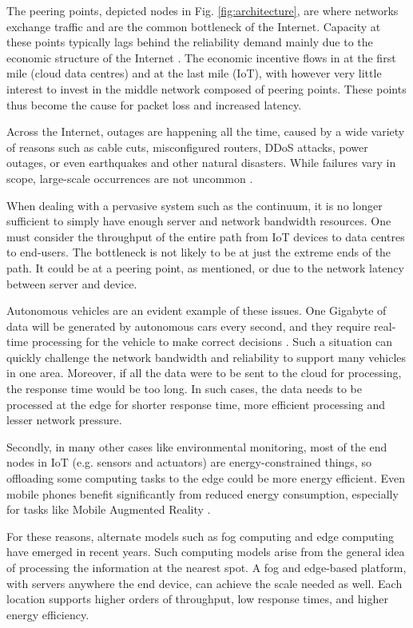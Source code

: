 The peering points, depicted nodes in Fig. \ref{fig:architecture}, are where networks exchange traffic and are the common bottleneck of the Internet. Capacity at these points typically lags behind the reliability demand mainly due to the economic structure of the Internet \cite{nygren2010akamai}. The economic incentive flows in at the first mile (cloud data centres) and at the last mile (IoT), with however very little interest to invest in the middle network composed of peering points. These points thus become the cause for packet loss and increased latency.

Across the Internet, outages are happening all the time, caused by a wide variety of reasons such as cable cuts, misconfigured routers, DDoS attacks, power outages, or even earthquakes and other natural disasters. While failures vary in scope, large-scale occurrences are not uncommon \cite{aws-outage}.

When dealing with a pervasive system such as the continuum, it is no longer sufficient to simply have enough server and network bandwidth resources. One must consider the throughput of the entire path from IoT devices to data centres to end-users. The bottleneck is not likely to be at just the extreme ends of the path. It could be at a peering point, as mentioned, or due to the network latency between server and device. 

Autonomous vehicles are an evident example of these issues. One Gigabyte of data will be generated by autonomous cars every second, and they require real-time processing for the vehicle to make correct decisions \cite{shi2016edge}. Such a situation can quickly challenge the network bandwidth and reliability to support many vehicles in one area. Moreover, if all the data were to be sent to the cloud for processing, the response time would be too long. In such cases, the data needs to be processed at the edge for shorter response time, more efficient processing and lesser network pressure.

Secondly, in many other cases like environmental monitoring, most of the end nodes in IoT (e.g. sensors and actuators) are energy-constrained things, so offloading some computing tasks to the edge could be more energy efficient. Even mobile phones benefit significantly from reduced energy consumption, especially for tasks like Mobile Augmen\-ted Reality \cite{baresi2017empowering}.

For these reasons, alternate models such as fog computing \cite{fog-computing} and edge computing \cite{shi2016edge} have emerged in recent years. Such computing models arise from the general idea of processing the information at the nearest spot. A fog and edge-based platform, with servers anywhere the end device, can achieve the scale needed as well. Each location supports higher orders of throughput, low response times, and higher energy efficiency.

